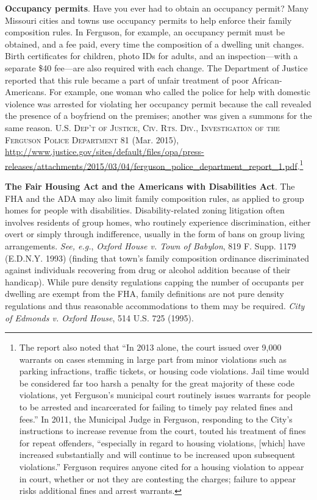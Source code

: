 \item
\textbf{Occupancy permits}. Have you ever had to obtain an occupancy permit?
Many Missouri cities and towns use occupancy permits to help enforce their
family composition rules. In Ferguson, for example, an occupancy permit must be
obtained, and a fee paid, every time the composition of a dwelling unit changes.
Birth certificates for children, photo IDs for adults, and an inspection---with
a separate \$40 fee---are also required with each change. The Department of
Justice reported that this rule became a part of unfair treatment of poor
African-Americans. For example, one woman who called the police for help with
domestic violence was arrested for violating her occupancy permit because the
call revealed the presence of a boyfriend on the premises; another was given a
summons for the same reason. \textsc{U.S. Dep't of Justice, Civ. Rts. Div.,
Investigation of the Ferguson Police Department} 81 (Mar. 2015),
\url{http://www.justice.gov/sites/default/files/opa/press-releases/attachments/2015/03/04/ferguson_police_department_report_1.pdf}.\footnote{The
report also noted that ``In 2013 alone, the court issued over 9,000 warrants on
cases stemming in large part from minor violations such as parking infractions,
traffic tickets, or housing code violations. Jail time would be considered far
too harsh a penalty for the great majority of these code violations, yet
Ferguson's municipal court routinely issues warrants for people to be arrested
and incarcerated for failing to timely pay related fines and fees.'' In 2011,
the Municipal Judge in Ferguson, responding to the City's instructions to
increase revenue from the court, touted his treatment of fines for repeat
offenders, ``especially in regard to housing violations, [which] have increased
substantially and will continue to be increased upon subsequent violations.''
Ferguson requires anyone cited for a housing violation to appear in court,
whether or not they are contesting the charges; failure to appear risks
additional fines and arrest warrants.}

\item
\textbf{The Fair Housing Act and the Americans with Disabilities Act}. The FHA
and the ADA may also limit family composition rules, as applied to group homes
for people with disabilities. Disability-related zoning litigation often
involves residents of group homes, who routinely experience discrimination,
either overt or simply through indifference, usually in the form of bans on
group living arrangements. \textit{See, e.g.}, \emph{Oxford House v. Town of
Babylon}, 819 F. Supp. 1179 (E.D.N.Y. 1993) (finding that town's family
composition ordinance discriminated against individuals recovering from drug or
alcohol addition because of their handicap). While pure density regulations
capping the number of occupants per dwelling are exempt from the FHA, family
definitions are not pure density regulations and thus reasonable accommodations
to them may be required. \emph{City of Edmonds v. Oxford House}, 514 U.S. 725
(1995).

